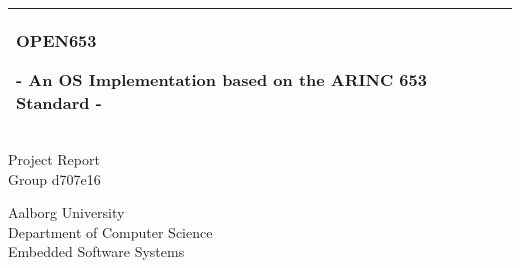 %
\begin{titlepage}
	\addtolength{\hoffset}{0.5\evensidemargin-0.5\oddsidemargin} %
	\noindent%
	\begin{tabular}{@{}p{\textwidth}@{}}
		\toprule[2pt]
		\midrule
		\vspace{0.2cm}
		\begin{center}
			\Huge{\textbf{
				OPEN653
			}}
		\end{center}
		\begin{center}
			\Large{
				- An OS Implementation based on the ARINC 653 Standard -
			}
		\end{center}
		\vspace{0.2cm}\\
		\midrule
		\toprule[2pt]
	\end{tabular}
	\vspace{4 cm}
	\begin{center}
		{\large
			Project Report
		}\\
		\vspace{0.2cm}
		{\Large
			Group d707e16
		}
	\end{center}
	\vfill
	\begin{center}
		Aalborg University\\
		Department of Computer Science\\
		Embedded Software Systems
	\end{center}
\end{titlepage}
\clearpage
